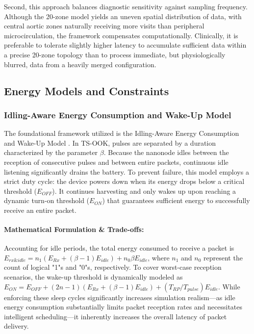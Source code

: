 \documentclass[sigconf]{acmart}
\begin{document}
Second, this approach balances diagnostic sensitivity against sampling frequency. Although the 20-zone model yields an uneven spatial distribution of data, with central aortic zones naturally receiving more visits than peripheral microcirculation, the framework compensates computationally. Clinically, it is preferable to tolerate slightly higher latency to accumulate sufficient data within a precise 20-zone topology than to process immediate, but physiologically blurred, data from a heavily merged configuration.

\subsection{Energy Models and Constraints}

\subsubsection{Idling-Aware Energy Consumption and Wake-Up Model}
The foundational framework utilized is the Idling-Aware Energy Consumption and Wake-Up Model \cite{lemic2019idling}. In TS-OOK, pulses are separated by a duration characterized by the parameter $\beta$. Because the nanonode idles between the reception of consecutive pulses and between entire packets, continuous idle listening significantly drains the battery. To prevent failure, this model employs a strict duty cycle: the device powers down when its energy drops below a critical threshold ($E_{OFF}$). It continues harvesting and only wakes up upon reaching a dynamic turn-on threshold ($E_{ON}$) that guarantees sufficient energy to successfully receive an entire packet.

\paragraph{Mathematical Formulation \& Trade-offs:} Accounting for idle periods, the total energy consumed to receive a packet is $E_{rx\&idle} = n_1 (E_{Rx} + (\beta - 1) E_{idle}) + n_0 \beta E_{idle}$, where $n_1$ and $n_0$ represent the count of logical "1"s and "0"s, respectively. To cover worst-case reception scenarios, the wake-up threshold is dynamically modeled as $E_{ON} = E_{OFF} + (2n - 1)(E_{Rx} + (\beta - 1)E_{idle}) + (T_{RP}/T_{pulse})E_{idle}$. While enforcing these sleep cycles significantly increases simulation realism—as idle energy consumption substantially limits packet reception rates and necessitates intelligent scheduling—it inherently increases the overall latency of packet delivery.
\end{document}
